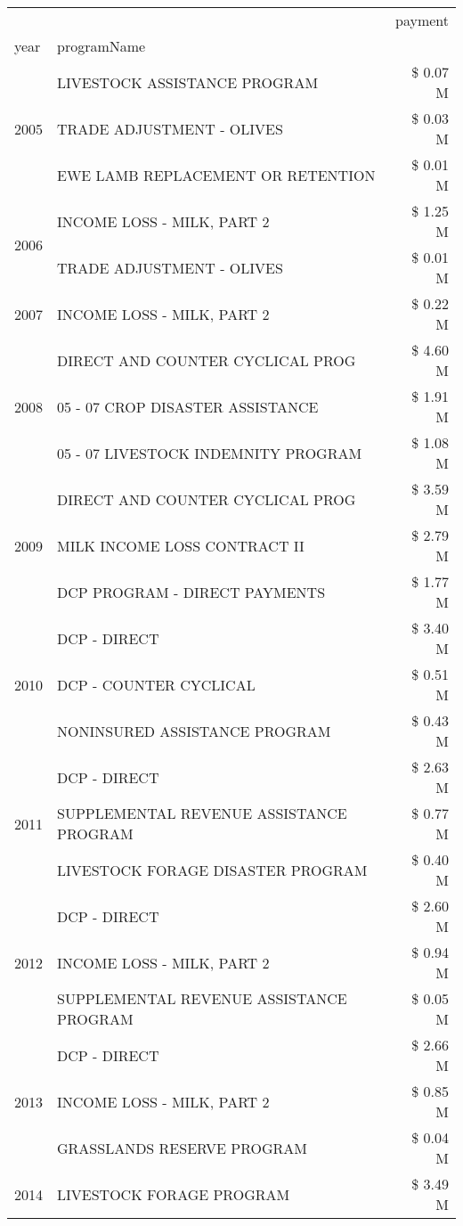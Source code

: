 \begin{tabular}{llr}
\toprule
 &  & payment \\
year & programName &  \\
\midrule
\multirow[t]{3}{*}{2005} & LIVESTOCK ASSISTANCE PROGRAM & \$ 0.07 M \\
 & TRADE ADJUSTMENT - OLIVES & \$ 0.03 M \\
 & EWE LAMB REPLACEMENT OR RETENTION & \$ 0.01 M \\
\cline{1-3}
\multirow[t]{2}{*}{2006} & INCOME LOSS - MILK, PART 2 & \$ 1.25 M \\
 & TRADE ADJUSTMENT - OLIVES & \$ 0.01 M \\
\cline{1-3}
2007 & INCOME LOSS - MILK, PART 2 & \$ 0.22 M \\
\cline{1-3}
\multirow[t]{3}{*}{2008} & DIRECT AND COUNTER CYCLICAL PROG & \$ 4.60 M \\
 & 05 - 07 CROP DISASTER ASSISTANCE & \$ 1.91 M \\
 & 05 - 07 LIVESTOCK INDEMNITY PROGRAM & \$ 1.08 M \\
\cline{1-3}
\multirow[t]{3}{*}{2009} & DIRECT AND COUNTER CYCLICAL PROG & \$ 3.59 M \\
 & MILK INCOME LOSS CONTRACT II & \$ 2.79 M \\
 & DCP PROGRAM - DIRECT PAYMENTS & \$ 1.77 M \\
\cline{1-3}
\multirow[t]{3}{*}{2010} & DCP - DIRECT & \$ 3.40 M \\
 & DCP - COUNTER CYCLICAL & \$ 0.51 M \\
 & NONINSURED ASSISTANCE PROGRAM & \$ 0.43 M \\
\cline{1-3}
\multirow[t]{3}{*}{2011} & DCP - DIRECT & \$ 2.63 M \\
 & SUPPLEMENTAL REVENUE ASSISTANCE PROGRAM & \$ 0.77 M \\
 & LIVESTOCK FORAGE DISASTER PROGRAM & \$ 0.40 M \\
\cline{1-3}
\multirow[t]{3}{*}{2012} & DCP - DIRECT & \$ 2.60 M \\
 & INCOME LOSS - MILK, PART 2 & \$ 0.94 M \\
 & SUPPLEMENTAL REVENUE ASSISTANCE PROGRAM & \$ 0.05 M \\
\cline{1-3}
\multirow[t]{3}{*}{2013} & DCP - DIRECT & \$ 2.66 M \\
 & INCOME LOSS - MILK, PART 2 & \$ 0.85 M \\
 & GRASSLANDS RESERVE PROGRAM & \$ 0.04 M \\
\cline{1-3}
\multirow[t]{3}{*}{2014} & LIVESTOCK FORAGE PROGRAM & \$ 3.49 M \\

\end{tabular}
